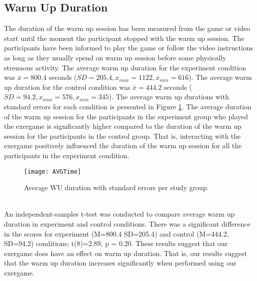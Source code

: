\subsection{Warm Up Duration}
The duration of the warm up session has been measured from the game or video start until the moment the participant stopped with the warm up session. The participants have been informed to play the game or follow the video instructions as long as they usually spend on warm up session before some physically strenuous activity. The average warm up duration for the experiment condition was \begin{math}\bar{x} = 800.4 \end{math} seconds (\begin{math} SD = 205.4, x_{max}=1122, x_{min}=616 \end{math}). The average warm up duration for the control condition was \begin{math}\bar{x} = 444.2 \end{math} seconds (\begin{math} SD = 94.2, x_{max}= 576, x_{min}= 345\end{math}). The average warm up durations with standard errors for each condition is presented in Figure \ref{fig:wuduration}. The average duration of the warm up session for the participants in the experiment group who played the exergame is significantly higher compared to the duration of the warm up session for the participants in the control group. That is, interacting with the exergame positively influenced the duration of the warm up session for all the participants in the experiment condition.\\
\begin{figure}[h]
    \centering
    \texttt{[image: AVGTime]}
    \caption{Average WU duration with standard errors per study group.}
    \label{fig:wuduration}
\end{figure}\\
An independent-samples t-test was conducted to compare average warm up duration in experiment and control conditions. There was a significant difference in the scores for experiment (M=800.4 SD=205.4) and control (M=444.2, SD=94.2) conditions; t(8)=2.89, p = 0.20. These results suggest that our exergame does have an effect on warm up duration. That is, our results suggest that the warm up duration increases significantly when performed using our exergame. 
